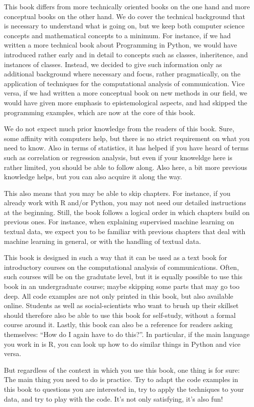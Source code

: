 This book differs from more technically oriented books on the one hand
and more conceptual books on the other hand. We do cover the technical
background that is necessary to understand what is going on, but we
keep both computer science concepts and mathematical concepts to a
minimum. For instance, if we had written a more technical book about
Programming in Python, we would have introduced rather early and in
detail to concepts such as classes, inheritence, and instances of
classes. Instead, we decided to give such information only as
additional background where necessary and focus, rather pragmatically,
on the application of techniques for the computational analysis of
communication. Vice versa, if we had written a more conceptual book on
new methods in our field, we would have given more emphasis to
epistemological aspects, and had skipped the programming examples,
which are now at the core of this book.

We do not expect much prior knowledge from the readers of this
book. Sure, some affinity with computers help, but there is no strict
requirement on what you need to know. Also in terms of statistics, it
has helped if you have heard of terms such as correlation or
regression analysis, but even if your knoweldge here is rather
limited, you should be able to follow along. Also here, a bit more
previous knowledge helps, but you can also acquire it along the way.

This also means that you may be able to skip chapters. For instance,
if you already work with R and/or Python, you may not need our
detailed instructions at the beginning. Still, the book follows a
logical order in which chapters build on previous ones. For instance,
when explaining supervised machine learning on textual data, we expect
you to be familiar with previous chapters that deal with machine
learning in general, or with the handling of textual data.

This book is designed in such a way that it can be used as a text book
for introductory courses on the computational analysis of
communications. Often, such courses will be on the gradutate level,
but it is equally possible to use this book in an undergraduate
course; maybe skipping some parts that may go too deep. All code
examples are not only printed in this book, but also available
online. Students as well as social-scientists who want to brush up
their skillset should therefore also be able to use this book for
self-study, without a formal course around it. Lastly, this book can
also be a reference for readers asking themselves: ``How do I again
have to do this?''. In particular, if the main language you work in is
R, you can look up how to do similar things in Python and vice versa.

But regardless of the context in which you use this book, one thing is
for sure: The main thing you need to do is practice. Try to adapt the
code examples in this book to questions you are interested in, try to
apply the techniques to your data, and try to play with the code. It's
not only satisfying, it's also fun!
